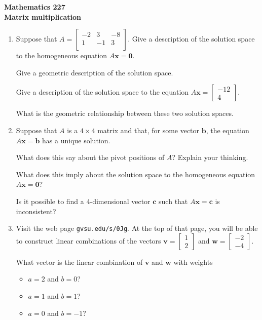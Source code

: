 \documentclass[12pt]{article}
\newcommand{\vs}[1]{\vspace{#1in}}
\newcommand{\bvec}{{\mathbf b}}
\newcommand{\cvec}{{\mathbf c}}
\newcommand{\vvec}{{\mathbf v}}
\newcommand{\wvec}{{\mathbf w}}
\newcommand{\xvec}{{\mathbf x}}
\newcommand{\zerovec}{{\mathbf 0}}
\newcommand{\twovec}[2]{\left[\begin{array}{r}#1 \\ #2
    \end{array}\right]}
\begin{document}
\noindent
{\bf Mathematics 227} \\ 
{\bf Matrix multiplication}

\bigskip
\begin{enumerate}
\item Suppose that
  $A =
  \left[
    \begin{array}{ccc}
      -2 & 3 & -8 \\
      1 & -1 & 3 \\
    \end{array}
  \right].
  $
  Give a description of the solution space to the homogeneous equation
  $A\xvec = \zerovec$.

  \vs{1.5}
  Give a geometric description of the solution space.

  \vs{1}
  Give a description of the solution space to the equation
  $A\xvec = \twovec{-12}{4}$.


  \vs{1.5}
  What is the geometric relationship between these two solution
  spaces.

  \vs{1}

\item Suppose that $A$ is a $4\times4$ matrix and that, for some
  vector $\bvec$, the equation
  $A\xvec=\bvec$ has a unique solution.

  \medskip
  What does this say about the pivot positions of $A$?  Explain your
  thinking.

  \vs{1}
  What does this imply about the solution space to the homogeneous
  equation $A\xvec = \zerovec$?

  \vs{1}
  Is it possible to find a 4-dimensional vector $\cvec$ such that
  $A\xvec=\cvec$ is inconsistent?

  \vs{1}

\item Visit the web page {\tt gvsu.edu/s/0Jg}.  At the top of that
  page, you will be able to construct linear combinations of the
  vectors
  $\vvec = \twovec12$ and $\wvec=\twovec{-2}{-4}$.

  \medskip
  What vector is the linear combination of $\vvec$ and $\wvec$ with
  weights

  \begin{itemize}
  \item $a=2$ and $b=0$?

    \vs{0.25}
  \item $a=1$ and $b=1$?

    \vs{0.25}
  \item $a=0$ and $b=-1$?


\end{itemize}
\end{enumerate}
\end{document}
